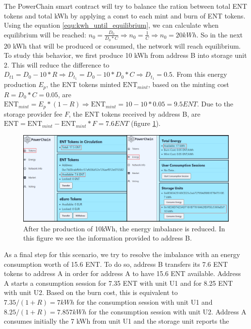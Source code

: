 The PowerChain smart contract will try to balance the ration between total ENT tokens and total kWh by applying a const to each mint and burn of ENT tokens. Using the equation \ref{equ:kwh_until_equilibrium}, we can calculate when
equilibrium will be reached:
\begin{math}
    n_0 = \frac{D_0}{D_0*C} \Rightarrow n_0 = \frac{1}{C} \Rightarrow n_0 = 20 kWh
\end{math}.
So in the next 20 kWh that will be produced or consumed, the network will reach equilibrium. To study this behavior, we first produce 10 kWh from address B into storage unit 2.
This will reduce the difference to $D_{t1} = D_0 - 10*R \Rightarrow D_{t_1} = D_0 - 10*D_0*C \Rightarrow D_{t_1} = 0.5$. From this energy production $E_p$, the ENT tokens minted $\textrm{ENT}_{mint}$, based on the
minting cost $R=D_0*C=0.05$, are $\textrm{ENT}_{mint}=E_p*(1-R) \Rightarrow \textrm{ENT}_{mint}=10-10*0.05=9.5 ENT$. Due to the storage provider fee $F$, the ENT tokens received by
address B, are $\textrm{ENT} = \textrm{ENT}_{mint} - \textrm{ENT}_{mint} * F = 7.6 ENT$ (figure \ref{fig:reduce_imbalance}).\\
\begin{figure}[h!]
    \centering
    \includegraphics[width=\linewidth,frame,scale=1]{Figures/reduce_imbalance.png}
    \caption{After the production of 10kWh, the energy imbalance is reduced. In this figure we see the information provided to address B.}
    \label{fig:reduce_imbalance}
\end{figure}
As a final step for this scenario, we try to resolve the imbalance with an energy consumption worth of 15.6 ENT. To do so, address B transfers
its 7.6 ENT tokens to address A in order for address A to have 15.6 ENT available. Address A starts a consumption session for 7.35 ENT with unit U1 
and for 8.25 ENT with unit U2. Based on the burn cost, this is equivalent to $7.35/(1+R) = 7 kWh$ for the consumption session with unit U1 and 
$8.25/(1+R) = 7.857 kWh$ for the consumption session with unit U2. Address A consumes initially the 7 kWh from unit U1 and the storage unit reports the
